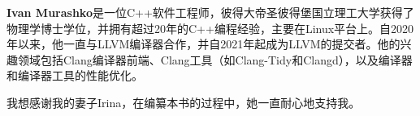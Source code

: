 \textbf{Ivan Murashko}是一位C++软件工程师，彼得大帝圣彼得堡国立理工大学获得了物理学博士学位，并拥有超过20年的C++编程经验，主要在Linux平台上。自2020年以来，他一直与LLVM编译器合作，并自2021年起成为LLVM的提交者。他的兴趣领域包括Clang编译器前端、Clang工具（如Clang-Tidy和Clangd），以及编译器和编译器工具的性能优化。

我想感谢我的妻子Irina，在编纂本书的过程中，她一直耐心地支持我。


